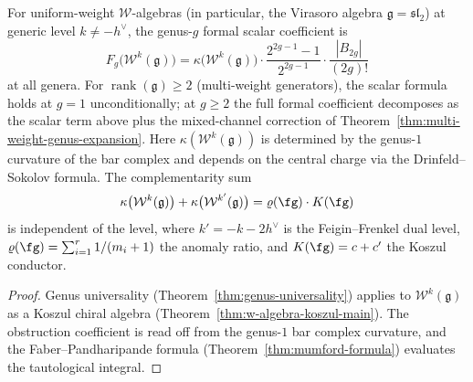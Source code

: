 \begin{theorem}
For uniform-weight $\mathcal{W}$-algebras
\textup{(}in particular, the Virasoro algebra
$\mathfrak{g} = \mathfrak{sl}_2$\textup{)} at generic level
$k \neq -h^\vee$, the genus-$g$ formal scalar coefficient is
\begin{equation}F_g\bigl(\mathcal{W}^k(\mathfrak{g})\bigr)
= \kappa\bigl(\mathcal{W}^k(\mathfrak{g})\bigr)
\cdot \frac{2^{2g-1}-1}{2^{2g-1}} \cdot
\frac{|B_{2g}|}{(2g)!}
\end{equation}
at all genera. For $\operatorname{rank}(\mathfrak{g}) \geq 2$
\textup{(}multi-weight generators\textup{)}, the scalar formula
holds at $g = 1$ unconditionally; at $g \geq 2$ the full formal
coefficient decomposes as the scalar term above plus the mixed-channel
correction of Theorem~\textup{\ref{thm:multi-weight-genus-expansion}}.
Here $\kappa(\mathcal{W}^k(\mathfrak{g}))$ is
determined by the genus-$1$ curvature of the bar
complex and depends on the central charge via the
Drinfeld--Sokolov formula. The complementarity sum
\[
\kappa\bigl(\mathcal{W}^k(\mathfrak{g})\bigr) +
\kappa\bigl(\mathcal{W}^{k'}(\mathfrak{g})\bigr)
= \varrho(\fg) \cdot K(\fg)
\]
is independent of the level, where
$k' = -k - 2h^\vee$ is the Feigin--Frenkel
dual level, $\varrho(\fg) = \sum_{i=1}^r 1/(m_i+1)$
the anomaly ratio, and
$K(\fg) = c + c'$ the Koszul conductor.
\end{theorem}

\begin{proof}
Genus universality
(Theorem~\ref{thm:genus-universality}) applies
to $\mathcal{W}^k(\mathfrak{g})$ as a Koszul
chiral algebra
(Theorem~\ref{thm:w-algebra-koszul-main}).
The obstruction coefficient is read off from the
genus-$1$ bar complex curvature, and the
Faber--Pandharipande formula
(Theorem~\ref{thm:mumford-formula}) evaluates
the tautological integral.
\end{proof}

